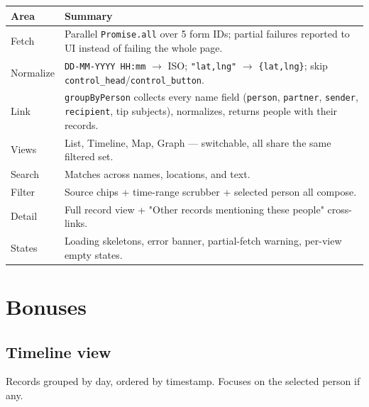 \documentclass[11pt,a4paper]{article}
\newcommand{\code}[1]{\texttt{\small #1}}
\begin{document}
\renewcommand{\arraystretch}{1.35}
\begin{tabularx}{\textwidth}{@{}lX@{}}
\toprule
\textbf{Area} & \textbf{Summary} \\
\midrule
Fetch     & Parallel \code{Promise.all} over 5 form IDs; partial failures reported to UI instead of failing the whole page. \\
Normalize & \code{DD-MM-YYYY HH:mm} $\rightarrow$ ISO; \code{"lat,lng"} $\rightarrow$ \code{\{lat,lng\}}; skip \code{control\_head}/\code{control\_button}. \\
Link      & \code{groupByPerson} collects every name field (\code{person}, \code{partner}, \code{sender}, \code{recipient}, tip subjects), normalizes, returns people with their records. \\
Views     & List, Timeline, Map, Graph --- switchable, all share the same filtered set. \\
Search    & Matches across names, locations, and text. \\
Filter    & Source chips + time-range scrubber + selected person all compose. \\
Detail    & Full record view + "Other records mentioning these people" cross-links. \\
States    & Loading skeletons, error banner, partial-fetch warning, per-view empty states. \\
\bottomrule
\end{tabularx}

\section{Bonuses}

\subsection{Timeline view}
Records grouped by day, ordered by timestamp. Focuses on the selected person if any.
\end{document}
